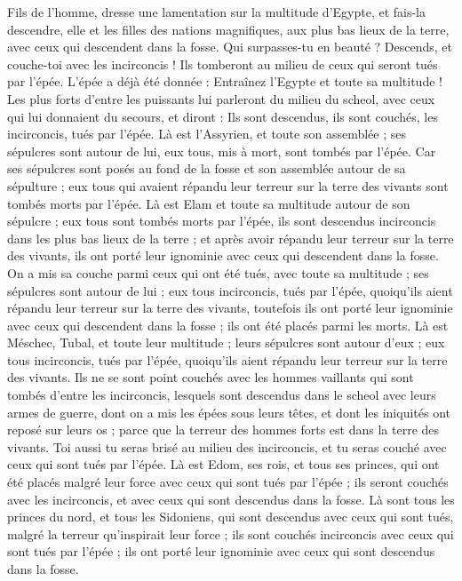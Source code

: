 \begin{multicols}{2}
Fils de l’homme, dresse une lamentation sur la multitude d'Egypte, et fais-la descendre, elle et les filles des nations magnifiques, aux plus bas lieux de la terre, avec ceux qui descendent dans la fosse\FTNT{}.
Qui surpasses-tu en beauté ? Descends, et couche-toi avec les incirconcis !
Ils tomberont au milieu de ceux qui seront tués par l'épée. L'épée a déjà été donnée : Entraînez l’Egypte et toute sa multitude !
Les plus forts d'entre les puissants lui parleront du milieu du scheol, avec ceux qui lui donnaient du secours, et diront : Ils sont descendus, ils sont couchés, les incirconcis, tués par l'épée.
Là est l'Assyrien, et toute son assemblée ; ses sépulcres sont autour de lui, eux tous, mis à mort, sont tombés par l'épée.
Car ses sépulcres sont posés au fond de la fosse et son assemblée autour de sa sépulture ; eux tous qui avaient répandu leur terreur sur la terre des vivants sont tombés morts par l'épée.
Là est Elam et toute sa multitude autour de son sépulcre ; eux tous sont tombés morts par l'épée, ils sont descendus incirconcis dans les plus bas lieux de la terre ; et après avoir répandu leur terreur sur la terre des vivants, ils ont porté leur ignominie avec ceux qui descendent dans la fosse.
On a mis sa couche parmi ceux qui ont été tués, avec toute sa multitude ; ses sépulcres sont autour de lui ; eux tous incirconcis, tués par l'épée, quoiqu'ils aient répandu leur terreur sur la terre des vivants, toutefois ils ont porté leur ignominie avec ceux qui descendent dans la fosse ; ils ont été placés parmi les morts.
Là est Méschec, Tubal, et toute leur multitude ; leurs sépulcres sont autour d'eux ; eux tous incirconcis, tués par l'épée, quoiqu'ils aient répandu leur terreur sur la terre des vivants.
Ils ne se sont point couchés avec les hommes vaillants qui sont tombés d'entre les incirconcis, lesquels sont descendus dans le scheol avec leurs armes de guerre, dont on a mis les épées sous leurs têtes, et dont les iniquités ont reposé sur leurs os ; parce que la terreur des hommes forts est dans la terre des vivants.
Toi aussi tu seras brisé au milieu des incirconcis, et tu seras couché avec ceux qui sont tués par l'épée.
Là est Edom, ses rois, et tous ses princes, qui ont été placés malgré leur force avec ceux qui sont tués par l'épée ; ils seront couchés avec les incirconcis, et avec ceux qui sont descendus dans la fosse.
Là sont tous les princes du nord, et tous les Sidoniens, qui sont descendus avec ceux qui sont tués, malgré la terreur qu’inspirait leur force ; ils sont couchés incirconcis avec ceux qui sont tués par l'épée ; ils ont porté leur ignominie avec ceux qui sont descendus dans la fosse.

\end{multicols}
